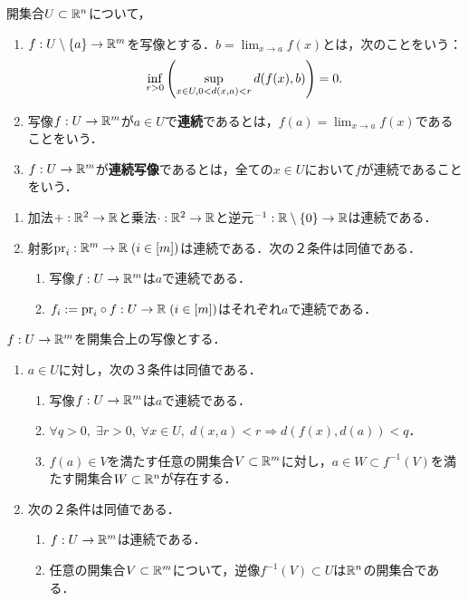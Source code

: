 \documentclass[uplatex,dvipdfmx]{jsreport}
\begin{document}
\begin{definition}
    開集合$U\subset \mathbb{R}^n$について，
    \begin{enumerate}
        \item $f:U\setminus\{a\}\to\mathbb{R}^m$を写像とする．$b=\lim_{x\to a}f(x)$とは，次のことをいう：
        \[ \inf_{r>0}\left(\sup_{x\in U,\\0<d(x,a)<r}d(f(x),b)\right)=0. \]
        \item 写像$f:U\to\mathbb{R}^m$が$a\in U$で\textbf{連続}であるとは，$f(a)=\lim_{x\to a}f(x)$であることをいう．
        \item $f:U\to\mathbb{R}^m$が\textbf{連続写像}であるとは，全ての$x\in U$において$f$が連続であることをいう．
    \end{enumerate}
\end{definition}

\begin{proposition}\mbox{}
    \begin{enumerate}
        \item 加法$+:\mathbb{R}^2\to\mathbb{R}$と乗法$\cdot:\mathbb{R}^2\to\mathbb{R}$と逆元${}^{-1}:\mathbb{R}\setminus\{0\}\to\mathbb{R}$は連続である．
        \item 射影$\mathrm{pr}_i:\mathbb{R}^m\to\mathbb{R}\;(i\in[m])$は連続である．次の２条件は同値である．
        \begin{enumerate}[(1)]
            \item 写像$f:U\to\mathbb{R}^m$は$a$で連続である．
            \item $f_i:=\mathrm{pr}_i\circ f:U\to\mathbb{R}\;(i\in[m])$はそれぞれ$a$で連続である．
        \end{enumerate}
    \end{enumerate}
\end{proposition}

\begin{proposition}[連続写像の開集合による特徴付け]\label{prop-characterization-of-continuous-map-in-metric-spaces}
    $f:U\to\mathbb{R}^m$を開集合上の写像とする．
    \begin{enumerate}
        \item $a\in U$に対し，次の３条件は同値である．
        \begin{enumerate}[(1)]
            \item 写像$f:U\to\mathbb{R}^m$は$a$で連続である．
            \item $\forall q>0,\;\exists r>0,\; \forall x\in U,\; d(x,a)<r\Rightarrow d(f(x),d(a))<q$．
            \item $f(a)\in V$を満たす任意の開集合$V\subset\mathbb{R}^m$に対し，$a\in W\subset f^{-1}(V)$を満たす開集合$W\subset\mathbb{R}^n$が存在する．
        \end{enumerate}
        \item  次の２条件は同値である．
        \begin{enumerate}[(1)]
            \item $f:U\to\mathbb{R}^m$は連続である．
            \item 任意の開集合$V\subset\mathbb{R}^m$について，逆像$f^{-1}(V)\subset U$は$\mathbb{R}^n$の開集合である．
        \end{enumerate}
    \end{enumerate}
\end{proposition}
\end{document}
